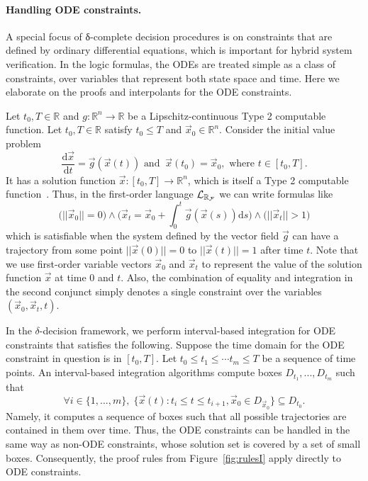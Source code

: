 \paragraph{Handling ODE constraints.} A special focus of δ-complete decision procedures is on constraints that are defined by ordinary differential equations, which is important for hybrid system verification. In the logic formulas, the ODEs are treated simple as a class of constraints, over variables that represent both state space and time. Here we elaborate on the proofs and interpolants for the ODE constraints.  

 Let $t_0, T\in \mathbb{R}$ and $g:\mathbb{R}^n\rightarrow \mathbb{R}$ be a Lipschitz-continuous Type 2 computable function. Let $t_0, T\in \mathbb{R}$ satisfy $t_0\leq T$ and $\vec x_0\in \mathbb{R}^n$. Consider the initial value problem
\[\frac{\mathrm{d}\vec x}{\mathrm{d}t} = \vec g(\vec x(t))\mbox{ and } \ \vec x(t_0) = \vec x_0, \mbox{ where }t\in [t_0, T].\]
It has a solution function $\vec x: [t_0, T]\rightarrow \mathbb{R}^n$, which is itself a Type 2 computable function~\cite{CAbook}. Thus, in the first-order language $\mathcal{L}_{\mathbb{R}_{\mathcal{F}}}$ we can write formulas like
\[\Big(||\vec x_0||=0\Big) \wedge\Big( \vec x_t = \vec x_0+\int_0^t \vec g(\vec x(s))\mathrm{d}s\Big) \wedge\Big(||\vec x_t|| > 1\Big)\]
which is satisfiable when the system defined by the vector field $\vec g$ can have a trajectory from some point $||\vec x(0)||=0$ to $||\vec x(t)||=1$ after time $t$. Note that we use first-order variable vectors $\vec x_0$ and $\vec x_t$ to represent the value of the solution function $\vec x$ at time $0$ and $t$. Also, the combination of equality and integration in the second conjunct simply denotes a single constraint over the variables $(\vec x_0, \vec x_t, t)$. 

In the $\delta$-decision framework, we perform interval-based integration for ODE constraints that satisfies the following. Suppose the time domain for the ODE constraint in question is in $[t_0,T]$. Let $t_0\leq t_1\leq \cdots t_m\leq T$ be a sequence of time points. An interval-based integration algorithms compute boxes $D_{t_1},...,D_{t_m}$ such that 
$$\forall i\in \{1,...,m\},\; \{\vec x(t): t_i\leq t\leq t_{i+1}, \vec x_0\in D_{\vec x_0}\}\subseteq D_{t_0}.$$
Namely, it computes a sequence of boxes such that all possible trajectories are contained in them over time. Thus, the ODE constraints can be handled in the same way as non-ODE constraints, whose solution set is covered by a set of small boxes. Consequently, the proof rules from Figure~\ref{fig:rulesI} apply directly to ODE constraints. 





